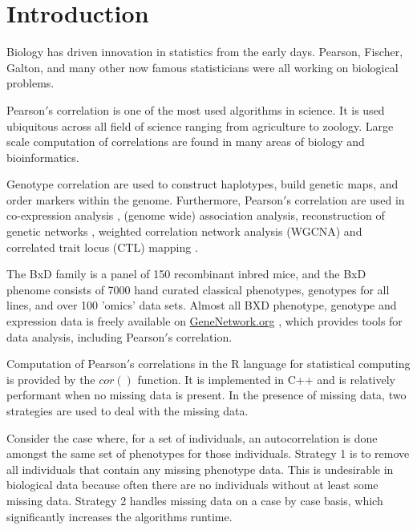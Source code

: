 \documentclass{bioinfo}
\begin{document}
\maketitle

\section{Introduction}
Biology has driven innovation in statistics from the early days. Pearson, Fischer, 
Galton, and many other now famous statisticians were all working on biological 
problems. 

\enlargethispage{12pt}

Pearson$'$s correlation is one of the most used algorithms in science. It is used 
ubiquitous across all field of science ranging from agriculture to zoology. Large 
scale computation of correlations are found in many areas of biology and 
bioinformatics. 

Genotype correlation are used to construct haplotypes, build genetic maps, and 
order markers within the genome. Furthermore, Pearson$'$s correlation are used in 
co-expression analysis \citep{Tesson:2010}, (genome wide) association analysis, 
reconstruction of genetic networks \citep{Fukushima:2013}, weighted correlation 
network analysis (WGCNA) \citep{Horvath:2008} and correlated trait locus (CTL) 
mapping \citep{Arends2016a}.

The BxD family is a panel of 150 recombinant inbred mice, and the BxD phenome consists 
of 7000 hand curated classical phenotypes, genotypes for all lines, and over 100 
'omics' data sets. Almost all BXD phenotype, genotype and expression data is freely 
available on \href{https://genenetwork.org/}{GeneNetwork.org} \citep{Sloan2016}, which 
provides tools for data analysis, including Pearson$'$s correlation.

Computation of Pearson$'$s correlations in the R language for statistical computing 
\citep{R:2005} is provided by the $cor()$ function. It is implemented in C++ and is 
relatively performant when no missing data is present. In the presence of missing 
data, two strategies are used to deal with the missing data.

Consider the case where, for a set of individuals, an autocorrelation is done 
amongst the same set of phenotypes for those individuals. Strategy 1 is to remove 
all individuals that contain any missing phenotype data. This is undesirable in 
biological data because often there are no individuals without at least some 
missing data. Strategy 2 handles missing data on a case by case basis, 
which significantly increases the algorithms runtime.
\end{document}
